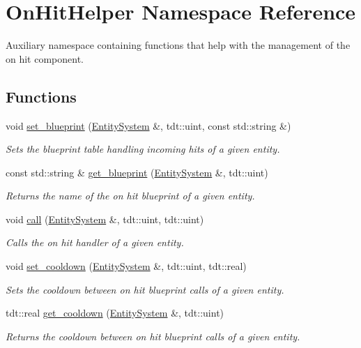 \hypertarget{namespace_on_hit_helper}{}\section{On\+Hit\+Helper Namespace Reference}
\label{namespace_on_hit_helper}


Auxiliary namespace containing functions that help with the management of the on hit component.  


\subsection*{Functions}
\begin{DoxyCompactItemize}
\item 
void \hyperlink{namespace_on_hit_helper_aa868597081eb5bdfda7899352991e401}{set\+\_\+blueprint} (\hyperlink{class_entity_system}{Entity\+System} \&, tdt\+::uint, const std\+::string \&)
\begin{DoxyCompactList}\small\item\em Sets the blueprint table handling incoming hits of a given entity. \end{DoxyCompactList}\item 
const std\+::string \& \hyperlink{namespace_on_hit_helper_a00747a4566974cf41cdf68f98df5d8c5}{get\+\_\+blueprint} (\hyperlink{class_entity_system}{Entity\+System} \&, tdt\+::uint)
\begin{DoxyCompactList}\small\item\em Returns the name of the on hit blueprint of a given entity. \end{DoxyCompactList}\item 
void \hyperlink{namespace_on_hit_helper_a31f9b73e6ba363f6ee896b8150a47098}{call} (\hyperlink{class_entity_system}{Entity\+System} \&, tdt\+::uint, tdt\+::uint)
\begin{DoxyCompactList}\small\item\em Calls the on hit handler of a given entity. \end{DoxyCompactList}\item 
void \hyperlink{namespace_on_hit_helper_a172869f715c9be2009baf49310858ce4}{set\+\_\+cooldown} (\hyperlink{class_entity_system}{Entity\+System} \&, tdt\+::uint, tdt\+::real)
\begin{DoxyCompactList}\small\item\em Sets the cooldown between on hit blueprint calls of a given entity. \end{DoxyCompactList}\item 
tdt\+::real \hyperlink{namespace_on_hit_helper_a4f7577721f9eb88a13b9c4881e30872d}{get\+\_\+cooldown} (\hyperlink{class_entity_system}{Entity\+System} \&, tdt\+::uint)
\begin{DoxyCompactList}\small\item\em Returns the cooldown between on hit blueprint calls of a given entity. \end{DoxyCompactList}\end{DoxyCompactItemize}


